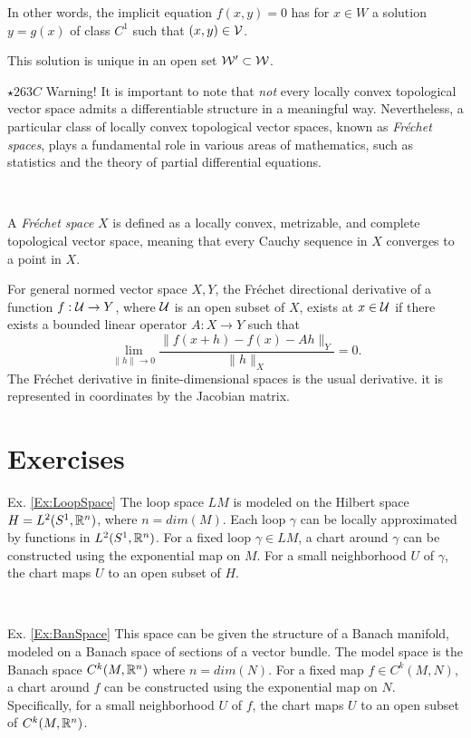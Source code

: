 In other words, the implicit equation $f(x,y)=0$ has for $x\in W$ a solution $y=g(x)$ of class $C^1$
such that $(x,y)\in \mathcal{V}$. 

This solution is unique in an open set $\mathcal{W}'\subset \mathcal{W}$.

\medskip 


$\star{263C}$ Warning! It is important to note that \emph{not} every locally convex topological vector space admits a differentiable structure in a meaningful way. Nevertheless, a particular class of locally convex topological vector spaces, known as \emph{Fréchet spaces}, plays a fundamental role in various areas of mathematics, such as statistics and the theory of partial differential equations.

\, 

A \emph{Fréchet space} $X$ is defined as a locally convex, metrizable, and complete topological vector space, meaning that every Cauchy sequence in $X$ converges to a point in $X$. 

 For general normed vector space $X,Y$,  the Fr\'echet directional derivative  of a function  $ f:\mathcal{U}\to Y$, where $ \mathcal{U}$ is an open subset of $X$, exists at $ x\in \mathcal{U}$  if there exists a bounded linear operator $A:X\to Y$ such that
\[
 \lim _{\|h\|\to 0}{\frac {\|f(x+h)-f(x)-Ah\|_{Y}}{\|h\|_{X}}}=0.
 \]
The Fréchet derivative in finite-dimensional spaces is the usual derivative.  it is represented in coordinates by the Jacobian matrix.

\section{Exercises}

Ex. \ref{Ex:LoopSpace} The loop space $LM$ is modeled on the Hilbert space $H=L^2(S^1,\mathbb{R}^n)$, where $n=dim(M)$. 
Each loop $\gamma$ can be locally approximated by functions in $L^2(S^1,\mathbb{R}^n)$.
For a fixed loop $\gamma\in LM$, a chart around $\gamma$ can be constructed using the exponential map on $M$. For a small neighborhood $U$ of $\gamma$, the chart maps $U$ to an open subset of $H$.

\, 

Ex. \ref{Ex:BanSpace} This space can be given the structure of a Banach manifold, modeled on a Banach space of sections of a vector bundle. The model space is the Banach space $C^k(M,\mathbb{R}^n)$ where $n=dim(N)$. For a fixed map $f\in C^k(M,N)$, a chart around $f$ can be constructed using the exponential map on $N$. Specifically, for a small neighborhood $U$ of $f$, the chart maps $U$ to an open subset of $C^k(M,\mathbb{R}^n)$.

